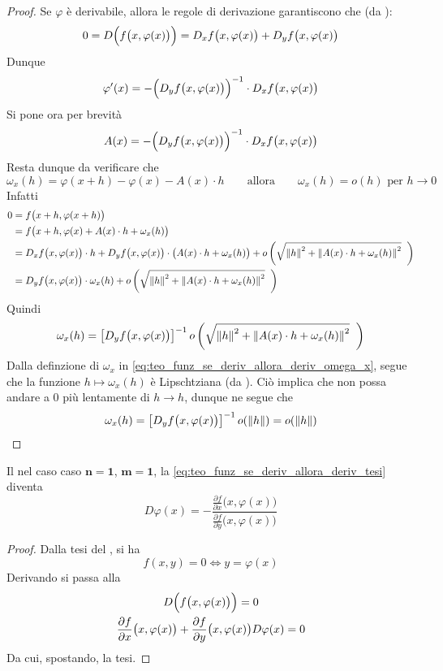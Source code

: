 \begin{theorem}
\begin{proof}
		Se $\varphi$ è derivabile, allora le regole di derivazione garantiscono che (da ):
		\[0 = D \Bigl( f \bigl( x, \varphi(x) \bigr) \Bigr) = D_xf \bigl( x, \varphi(x) \bigr) + D_yf \bigl( x, \varphi(x) \bigr)\]
		Dunque
		\[\varphi'(x) = -\Bigl( D_yf \bigl( x, \varphi(x) \bigr) \Bigr)^{-1} \cdot D_xf \bigl( x, \varphi(x) \bigr)\]
		Si pone ora per brevità
		\[A(x) = - \Bigl( D_yf \bigl( x, \varphi(x) \bigr) \Bigr)^{-1} \cdot D_xf \bigl( x, \varphi(x) \bigr)\]
		Resta dunque da verificare che
		\begin{equation}
			\label{eq:teo_funz_se_deriv_allora_deriv_omega_x}
			\omega_x(h) = \varphi(x + h) - \varphi(x) - A(x) \cdot h \qquad \text{allora} \qquad \omega_x(h) = o(h) \text{ per } h \to 0
		\end{equation}
		Infatti
		\begin{align*}
			0 &= f \bigl( x + h, \varphi(x + h) \bigr)\\
			&= f \bigl( x + h, \varphi(x) + A(x) \cdot h + \omega_x(h) \bigr)\\
			&= D_xf \bigl( x, \varphi(x) \bigr) \cdot h + D_yf \bigl( x, \varphi(x) \bigr) \cdot \bigl( A(x) \cdot h + \omega_x(h) \bigr) + o \left( \sqrt{ \left\|h\right\|^2 + \left\|A(x) \cdot h + \omega_x(h)\right\|^2 } \;\; \right)\\
			&= D_yf \bigl( x, \varphi(x) \bigr) \cdot \omega_x(h) + o \left( \sqrt{ \left\|h\right\|^2 + \left\|A(x) \cdot h + \omega_x(h)\right\|^2 } \;\; \right)
		\end{align*}
		Quindi
		\[\omega_x(h) = \left[ D_yf \bigl( x, \varphi(x) \bigr) \right]^{-1} o \left( \sqrt{ \left\|h\right\|^2 + \left\|A(x) \cdot h + \omega_x(h)\right\|^2 } \;\; \right)\]
		Dalla definzione di $\omega_x$ in \cref{eq:teo_funz_se_deriv_allora_deriv_omega_x}, segue che la funzione $h \mapsto \omega_x(h)$ è Lipschtziana (da ). Ciò implica che non possa andare a $0$ più lentamente di $h \to h$, dunque ne segue che
		\[\omega_x(h) = \left[ D_yf \bigl( x, \varphi(x) \bigr) \right]^{-1} o(\left\|h\right\|) = o(\left\|h\right\|)\]
		\color{black}
	\end{proof}
\end{theorem}
\begin{corollary}[Caso $n=1$, $m=1$]
	Il  nel caso caso $\boldsymbol{n=1}$, $\boldsymbol{m=1}$, la \cref{eq:teo_funz_se_deriv_allora_deriv_tesi} diventa
	\[D\varphi(x) = -\frac{\frac{\partial f}{\partial x}\bigl( x, \varphi(x) \bigr)}{\frac{\partial f}{\partial y}\bigl( x, \varphi(x) \bigr)}\]
	\begin{proof}
		Dalla tesi del , si ha
		\[f(x,y) = 0 \iff y = \varphi(x)\]
		Derivando si passa alla
		\[
			\begin{gathered}
				D\Bigl( f\bigl(x,\varphi(x) \bigr) \Bigr) = 0\\
				\frac{\partial f}{\partial x}\bigl( x, \varphi(x) \bigr) + \frac{\partial f}{\partial y}\bigl( x, \varphi(x) \bigr) D\varphi(x) = 0
			\end{gathered}
		\]
		Da cui, spostando, la tesi.
	\end{proof}
\end{corollary}
